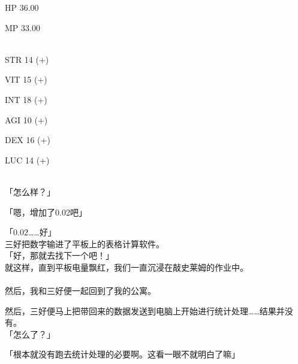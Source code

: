   HP  36.00

  MP  33.00

%  
\\

  STR 14 (+)

  VIT 15 (+)

  INT 18 (+)

  AGI 10 (+)

  DEX 16 (+)

  LUC 14 (+)

\cardline\\

「怎么样？」

「嗯，增加了0.02吧」

「0.02……好」\\

三好把数字输进了平板上的表格计算软件。\\

「好，那就去找下一个吧！」\\

就这样，直到平板电量飘红，我们一直沉浸在敲史莱姆的作业中。\\

\sqsplit\\

然后，我和三好便一起回到了我的公寓。

然后，三好便马上把带回来的数据发送到电脑上开始进行统计处理……结果并没有。\\

「怎么了？」

「根本就没有跑去统计处理的必要啊。这看一眼不就明白了嘛」\\

